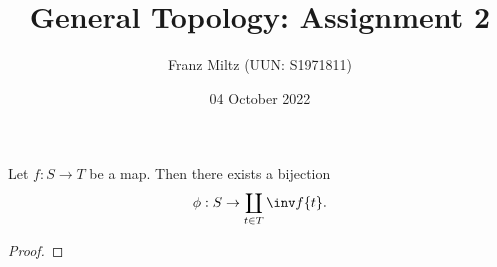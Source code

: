\documentclass{article}
\begin{document}
\title{General Topology: Assignment 2}
\author{Franz Miltz (UUN: S1971811)}
\date{04 October 2022}
\maketitle

\begin{claim*}[1]
  Let $f:S\to T$ be a map. Then there exists a bijection
  \begin{align*}
    \phi : S \to \coprod_{t\in T} \inv f \{t\}.
  \end{align*}
  \begin{proof}
  \end{proof}
\end{claim*}
\end{document}
